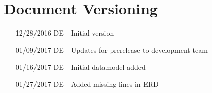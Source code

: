 \chapter*{Document Versioning}
\begin{enumerate}
    \item[12/28/2016] DE - Initial version
    \item[01/09/2017] DE - Updates for prerelease to development team
    \item[01/16/2017] DE - Initial datamodel added
    \item[01/27/2017] DE - Added missing lines in ERD
\end{enumerate}
